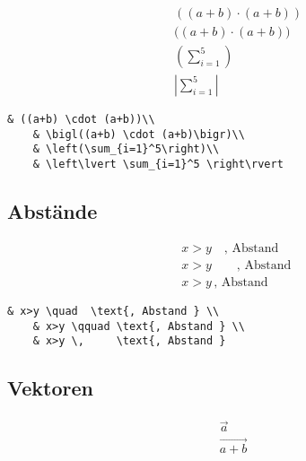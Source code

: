 \begin{align}
& ((a+b) \cdot (a+b))\\
& \bigl((a+b) \cdot (a+b)\bigr)\\
& \left(\sum_{i=1}^5\right)\\
& \left\lvert \sum_{i=1}^5 \right\rvert
\end{align}

\lstset{language=[LaTeX]TeX } %
\begin{lstlisting}[gobble=2, frame=none, numbers=none, backgroundcolor=\color{white},%
	caption={},label={code:}]
	& ((a+b) \cdot (a+b))\\
	& \bigl((a+b) \cdot (a+b)\bigr)\\
	& \left(\sum_{i=1}^5\right)\\
	& \left\lvert \sum_{i=1}^5 \right\rvert
\end{lstlisting}


\subsection{Abstände}\label{abstaende }

\begin{align}
& x>y \quad  \text{, Abstand } \\
& x>y \qquad \text{, Abstand } \\
& x>y \,     \text{, Abstand }
\end{align}

\lstset{language=[LaTeX]TeX } %
\begin{lstlisting}[gobble=2, frame=none, numbers=none, backgroundcolor=\color{white},%
	caption={},label={code:}]
	& x>y \quad  \text{, Abstand } \\
	& x>y \qquad \text{, Abstand } \\
	& x>y \,     \text{, Abstand }
\end{lstlisting}


\subsection{Vektoren}\label{vektoren }

\begin{align}
\vec{a}          \\   %
\overrightarrow{a+b}  %
\end{align}

